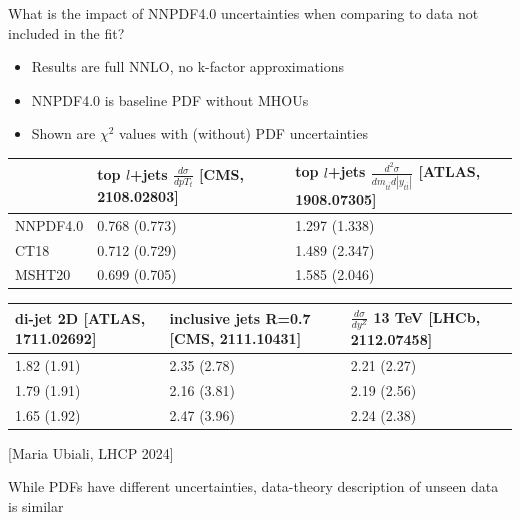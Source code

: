 \begin{frame}{What is the impact of NNPDF4.0 uncertainties when comparing to data not included in the fit?}
  \begin{itemize}
    \item Results are full NNLO, no k-factor approximations
    \item NNPDF4.0 is baseline PDF without MHOUs
    \item Shown are $\chi^2$ values with (without) PDF uncertainties
  \end{itemize}

  \begin{table}[]
    \footnotesize
    \begin{tabular}{@{}lll@{}}
    \toprule
             & top $l$+jets $\frac{d\sigma}{dpT_t}$ {\color{gray}\footnotesize [CMS, 2108.02803]}& top $l$+jets $\frac{d^2\sigma}{dm_{t\bar{t}}d|y_{t\bar{t}}|}$  {\color{gray}\footnotesize [ATLAS, 1908.07305]}\\ \midrule
    NNPDF4.0 & 0.768 (0.773)                            & 1.297 (1.338)                                                       \\
    CT18     & 0.712 (0.729)                            & 1.489 (2.347)                                                       \\
    MSHT20   & 0.699 (0.705)                            & 1.585 (2.046)                                                       \\ \bottomrule
    \end{tabular}
  \end{table}

  \begin{table}[]
    \footnotesize
    \begin{tabular}{@{}llll@{}}
    \toprule
    di-jet 2D {\color{gray}\footnotesize [ATLAS, 1711.02692]} & inclusive jets R=0.7 {\color{gray}\footnotesize [CMS, 2111.10431]}& $\frac{d\sigma}{dy^Z}$ 13 TeV {\color{gray}\footnotesize [LHCb, 2112.07458]}\\ \midrule
    1.82 (1.91)     & 2.35 (2.78)              & 2.21 (2.27)                        \\
    1.79 (1.91)     & 2.16 (3.81)              & 2.19 (2.56)                        \\
    1.65 (1.92)     & 2.47 (3.96)              & 2.24 (2.38)                        \\ \bottomrule
    \end{tabular}
  \end{table}


  \begin{center}
    {\color{gray}\footnotesize [Maria Ubiali, LHCP 2024]}
  \end{center}

  \vfill
  \begin{center}
    While PDFs have different uncertainties, data-theory description of unseen data is similar
  \end{center}

\end{frame}
